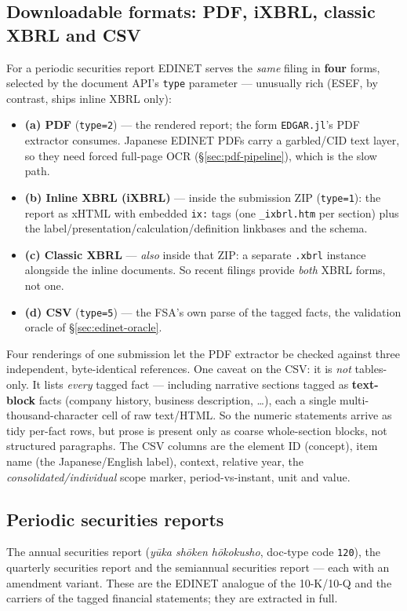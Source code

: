 \documentclass[11pt,a4paper]{report}
\begin{document}
\subsection{Downloadable formats: PDF, iXBRL, classic XBRL and CSV}\label{sec:edinet-formats}
For a periodic securities report EDINET serves the \emph{same} filing in \textbf{four} forms, selected by the
document API's \texttt{type} parameter --- unusually rich (ESEF, by contrast, ships inline XBRL only):
\begin{itemize}[nosep]
  \item \textbf{(a) PDF} (\texttt{type=2}) --- the rendered report; the form \texttt{EDGAR.jl}'s PDF
    extractor consumes. Japanese EDINET PDFs carry a garbled/CID text layer, so they need forced full-page
    OCR (\S\ref{sec:pdf-pipeline}), which is the slow path.
  \item \textbf{(b) Inline XBRL (iXBRL)} --- inside the submission ZIP (\texttt{type=1}): the report as
    xHTML with embedded \texttt{ix:} tags (one \texttt{\_ixbrl.htm} per section) plus the
    label/presentation/calculation/definition linkbases and the schema.
  \item \textbf{(c) Classic XBRL} --- \emph{also} inside that ZIP: a separate \texttt{.xbrl} instance
    alongside the inline documents. So recent filings provide \emph{both} XBRL forms, not one.
  \item \textbf{(d) CSV} (\texttt{type=5}) --- the FSA's own parse of the tagged facts, the validation
    oracle of \S\ref{sec:edinet-oracle}.
\end{itemize}

\noindent Four renderings of one submission let the PDF extractor be checked against three independent,
byte-identical references. One caveat on the CSV: it is \emph{not} tables-only. It lists \emph{every} tagged
fact --- including narrative sections tagged as \textbf{text-block} facts (company history, business
description, \ldots), each a single multi-thousand-character cell of raw text/HTML. So the numeric statements
arrive as tidy per-fact rows, but prose is present only as coarse whole-section blocks, not structured
paragraphs. The CSV columns are the element ID (concept), item name (the Japanese/English label), context,
relative year, the \emph{consolidated/individual} scope marker, period-vs-instant, unit and value.

\subsection{Periodic securities reports}
The annual securities report (\emph{y\=uka sh\=oken h\=okokusho}, doc-type code \texttt{120}), the quarterly
securities report and the semiannual securities report --- each with an amendment variant. These are the
EDINET analogue of the 10-K/10-Q and the carriers of the tagged financial statements; they are extracted in
full.
\end{document}
